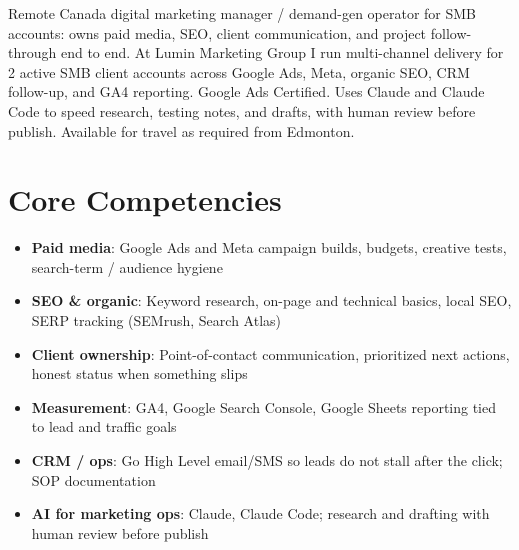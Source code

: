 \documentclass[11pt,a4paper,sans]{moderncv}
\begin{document}
\makecvtitle

\vspace{6pt}
\small{Remote Canada digital marketing manager / demand-gen operator for SMB accounts: owns paid media, SEO, client communication, and project follow-through end to end. At Lumin Marketing Group I run multi-channel delivery for 2 active SMB client accounts across Google Ads, Meta, organic SEO, CRM follow-up, and GA4 reporting. Google Ads Certified. Uses Claude and Claude Code to speed research, testing notes, and drafts, with human review before publish. Available for travel as required from Edmonton.}

\section{Core Competencies}
\vspace{1pt}
\begin{itemize}
\item \textbf{Paid media}: Google Ads and Meta campaign builds, budgets, creative tests, search-term / audience hygiene
\item \textbf{SEO \& organic}: Keyword research, on-page and technical basics, local SEO, SERP tracking (SEMrush, Search Atlas)
\item \textbf{Client ownership}: Point-of-contact communication, prioritized next actions, honest status when something slips
\item \textbf{Measurement}: GA4, Google Search Console, Google Sheets reporting tied to lead and traffic goals
\item \textbf{CRM / ops}: Go High Level email/SMS so leads do not stall after the click; SOP documentation
\item \textbf{AI for marketing ops}: Claude, Claude Code; research and drafting with human review before publish
\end{itemize}
\end{document}
